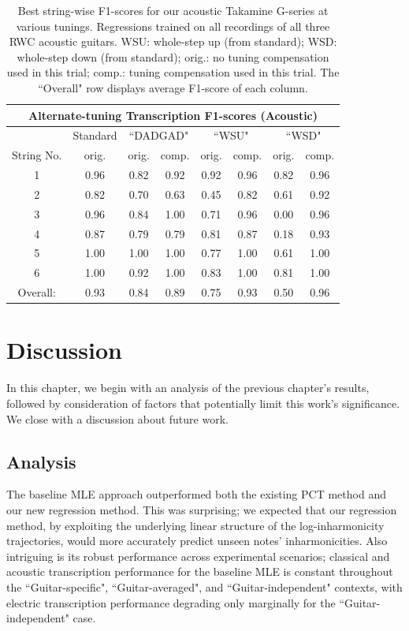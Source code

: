 \documentclass[12pt]{cmuthesis}
\begin{document}
\begin{table}[!htbp]
\begin{center}
\begin{tabular}{||c||c||c|c||c|c||c|c||}
\hline
\multicolumn{8}{|c|}{\bf{Alternate-tuning Transcription F1-scores (Acoustic)}} \\
\hline
& Standard & \multicolumn{2}{|c|}{``DADGAD"} & \multicolumn{2}{|c|}{``WSU"} & \multicolumn{2}{|c|}{``WSD"} \\
\hline
String No. & orig. & orig. & comp. & orig. & comp. & orig. & comp. \\
\hline
1 & 0.96 & 0.82 & 0.92 & 0.92 & 0.96 & 0.82 & 0.96 \\
\hline
2 & 0.82 & 0.70 & 0.63 & 0.45 & 0.82 & 0.61 & 0.92\\
\hline
3 & 0.96 & 0.84 & 1.00 & 0.71 & 0.96 & 0.00 & 0.96\\
\hline
4 & 0.87 & 0.79 & 0.79 & 0.81 & 0.87 & 0.18 & 0.93 \\
\hline
5 & 1.00 & 1.00 & 1.00 & 0.77 & 1.00 & 0.61 & 1.00 \\
\hline
6 & 1.00 & 0.92 & 1.00 & 0.83 & 1.00 & 0.81 & 1.00\\ 
\hline
\hline
Overall: & 0.93 & 0.84 & 0.89 & 0.75 & 0.93 & 0.50 & 0.96\\
\hline
\end{tabular}
\caption{Best string-wise F1-scores for our acoustic Takamine G-series at various tunings. Regressions trained on all recordings of all three RWC acoustic guitars. WSU: whole-step up (from standard); WSD: whole-step down (from standard); orig.: no tuning compensation used in this trial; comp.: tuning compensation used in this trial. The ``Overall" row displays average F1-score of each column.} 
\label{tab:results-ag-tune}
\end{center}
\end{table}

\noindent
\chapter{Discussion}
\label{chap:discussion}
In this chapter, we begin with an analysis of the previous chapter's results, followed by consideration of factors that potentially limit this work's significance. We close with a discussion about future work.

\section{Analysis}
The baseline MLE approach outperformed both the existing PCT method and our new regression method. This was surprising; we expected that our regression method, by exploiting the underlying linear structure of the log-inharmonicity trajectories, would more accurately predict unseen notes' inharmonicities. Also intriguing is its robust performance across experimental scenarios; classical and acoustic transcription performance for the baseline MLE is constant throughout the ``Guitar-specific", ``Guitar-averaged", and ``Guitar-independent" contexts, with electric transcription performance degrading only marginally for the ``Guitar-independent" case.
\end{document}
